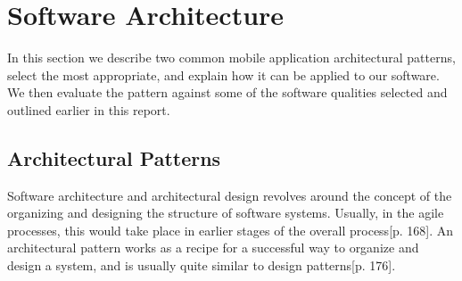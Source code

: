 
\section{Software Architecture}
In this section we describe two common mobile application architectural patterns, select the most appropriate, and explain how it can be applied to our software. We then evaluate the pattern against some of the software  qualities selected and outlined earlier in this report.

\subsection{Architectural Patterns}
Software architecture and architectural design revolves around the concept of the organizing and designing the structure of software systems. Usually, in the agile processes, this would take place in earlier stages of the overall process\cite{Sommerville}[p. 168]. An architectural pattern works as a recipe for a successful way to organize and design a system, and is usually quite similar to design patterns\cite{Sommerville}[p. 176].

